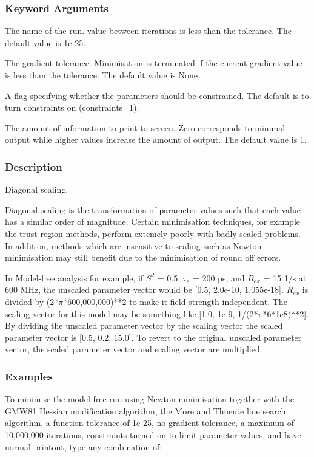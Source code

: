 \subsubsection{Keyword Arguments}

  The name of the run.
value between iterations is less than the tolerance.  The default value is 1e-25.

  The gradient tolerance.  Minimisation is terminated if the current gradient value is less than the tolerance.  The default value is None.

  A flag specifying whether the parameters should be constrained.  The default is to turn constraints on (constraints=1).


  The amount of information to print to screen.  Zero corresponds to minimal output while higher values increase the amount of output.  The default value is 1.

\subsubsection{Description}

Diagonal scaling.

Diagonal scaling is the transformation of parameter values such that each value has a
similar order of magnitude.  Certain minimisation techniques, for example the trust region
methods, perform extemely poorly with badly scaled problems.  In addition, methods which are
insensitive to scaling such as Newton minimisation may still benefit due to the minimisation
of round off errors.

In Model-free analysis for example, if $S^2$ = 0.5, $\tau_e$ = 200 ps, and $R_{ex}$ = 15 1/s at 600 MHz,
the unscaled parameter vector would be [0.5, 2.0e-10, 1.055e-18].  $R_{ex}$ is divided by
(2*$\pi$*600,000,000)**2 to make it field strength independent.  The scaling vector for this
model may be something like [1.0, 1e-9, 1/(2*$\pi$*6*1e8)**2].  By dividing the unscaled
parameter vector by the scaling vector the scaled parameter vector is [0.5, 0.2, 15.0].  To
revert to the original unscaled parameter vector, the scaled parameter vector and scaling
vector are multiplied.


\subsubsection{Examples}

To minimise the model-free run 
 using Newton minimisation together with the GMW81
Hessian modification algorithm, the More and Thuente line search algorithm, a function
tolerance of 1e-25, no gradient tolerance, a maximum of 10,000,000 iterations, constraints
turned on to limit parameter values, and have normal printout, type any combination of:

